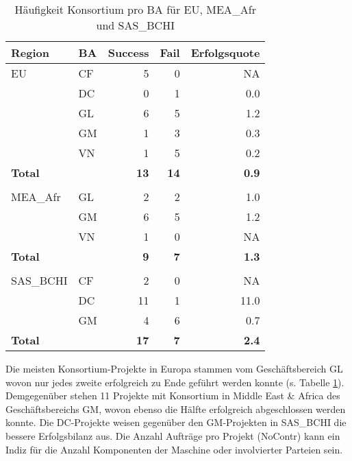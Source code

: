 \begin{table}[htbp]
	\centering
	\caption{Häufigkeit Konsortium pro BA für EU, MEA\_Afr und SAS\_BCHI}
	\begin{tabular}{llrrr}
		\textbf{Region} & \textbf{BA} & \multicolumn{1}{l}{\textbf{Success}} & \multicolumn{1}{l}{\textbf{Fail}} & \multicolumn{1}{l}{\textbf{Erfolgsquote}} \\\hline
		EU  & CF    & 5     & 0     & NA \\
		    & DC    & 0     & 1     & 0.0 \\
		    & GL    & 6     & 5     & 1.2 \\
		    & GM    & 1     & 3     & 0.3 \\
		    &VN    & 1     & 5     & 0.2 \\\hline
		\textbf{Total} &  & \textbf{13} & \textbf{14} & \textbf{0.9} \\
			  &  &  & & \\
	    MEA\_Afr &	GL    & 2     & 2     & 1.0 \\
	             & 	GM    & 6     & 5     & 1.2 \\
		         & VN    & 1     & 0     & NA \\\hline
		\textbf{Total} &  & \textbf{9} & \textbf{7} & \textbf{1.3} \\
		& & & & \\
		    SAS\_BCHI & \multicolumn{1}{l}{CF} & 2     & 0     & NA \\
		 & \multicolumn{1}{l}{DC} & 11    & 1     & 11.0 \\
		  & \multicolumn{1}{l}{GM} & 4     & 6     & 0.7 \\\hline
		\textbf{Total} &       &  \textbf{17}   & \textbf{7}     & \textbf{2.4} \\
	\end{tabular}%
	\label{consregba}%
\end{table}%
Die meisten Konsortium-Projekte in Europa stammen vom Geschäftsbereich GL wovon nur jedes zweite erfolgreich zu Ende geführt werden konnte (s. Tabelle \ref{consregba}). Demgegenüber stehen 11 Projekte mit Konsortium in Middle East \& Africa des Geschäftsbereichs GM, wovon ebenso die Hälfte erfolgreich abgeschlossen werden konnte. Die DC-Projekte weisen gegenüber den GM-Projekten in SAS\_BCHI die bessere Erfolgsbilanz aus.
%
%
\newline Die Anzahl Aufträge pro Projekt (NoContr) kann ein Indiz für die Anzahl Komponenten der Maschine oder involvierter Parteien sein. 
